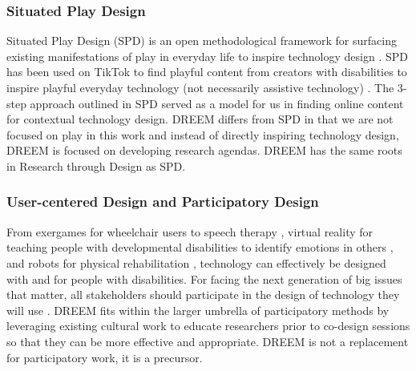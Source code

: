 \subsubsection{Situated Play Design}
Situated Play Design (SPD) is an open methodological framework for surfacing existing manifestations of play in everyday life to inspire technology design \cite{altarribabertranChasingPlayPotentials2019a,altarribabertranDesigningPlayThat2019}. SPD has been used on TikTok to find playful content from creators with disabilities to inspire playful everyday technology (not necessarily assistive technology) \cite{duvalChasingPlayTikTok2021}. The 3-step approach outlined in SPD served as a model for us in finding online content for contextual technology design. DREEM differs from SPD in that we are not focused on play in this work and instead of directly inspiring technology design, DREEM is focused on developing research agendas. DREEM has the same roots in Research through Design \cite{gaverWhatShouldWe2012,zimmermanResearchDesignMethod2007} as SPD.

\subsubsection{User-centered Design and Participatory Design} \label{PD}
From exergames for wheelchair users \cite{gerlingDesigningMovementbasedPlay2016} to speech therapy \cite{duvalSpokeItCoCreatedSpeech2018}, virtual reality for teaching people with developmental disabilities to identify emotions in others  \cite{thangPhDForumStrengthening2018}, and robots for physical rehabilitation \cite{marquezseguraPlayificationPhySeEarCase2016}, technology can effectively be designed with and for people with disabilities. For facing the next generation of big issues that matter, all stakeholders should participate in the design of technology they will use \cite{bodkerParticipatoryDesignThat2018}. DREEM fits within the larger umbrella of participatory methods by leveraging existing cultural work to educate researchers prior to co-design sessions so that they can be more effective and appropriate. DREEM is not a replacement for participatory work, it is a precursor.

